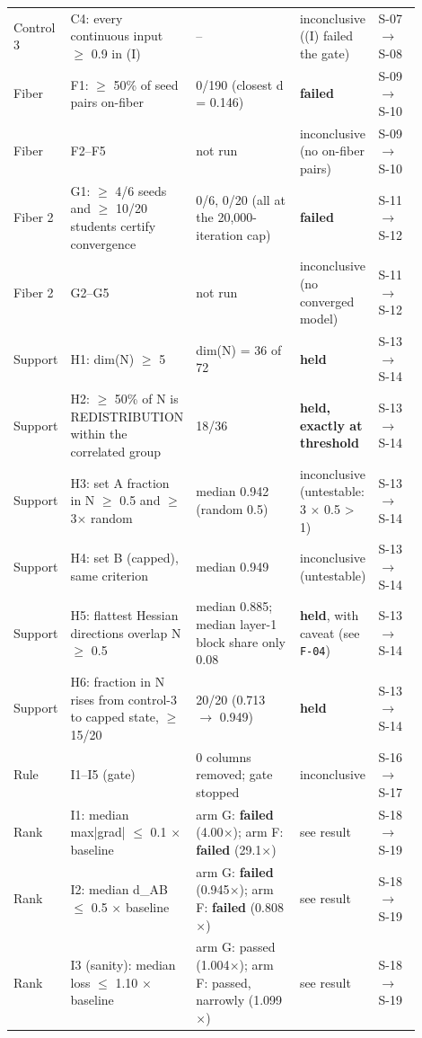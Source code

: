 {\begin{longtable}{R{0.14\linewidth} R{0.26\linewidth} R{0.29\linewidth} R{0.10\linewidth} R{0.11\linewidth}}
Control 3 & C4: every continuous input $\geq$ 0.9 in (I) & -- & inconclusive ((I) failed the gate) & S-07$\to$\allowbreak{}S-08 \\
Fiber & F1: $\geq$ 50\% of seed pairs on-fiber & 0/190 (closest d = 0.146) & \textbf{failed} & S-09$\to$\allowbreak{}S-10 \\
Fiber & F2--F5 & not run & inconclusive (no on-fiber pairs) & S-09$\to$\allowbreak{}S-10 \\
Fiber 2 & G1: $\geq$ 4/6 seeds and $\geq$ 10/20 students certify convergence & 0/6, 0/20 (all at the 20,000-iteration cap) & \textbf{failed} & S-11$\to$\allowbreak{}S-12 \\
Fiber 2 & G2--G5 & not run & inconclusive (no converged model) & S-11$\to$\allowbreak{}S-12 \\
Support & H1: dim(N) $\geq$ 5 & dim(N) = 36 of 72 & \textbf{held} & S-13$\to$\allowbreak{}S-14 \\
Support & H2: $\geq$ 50\% of N is REDISTRIBUTION within the correlated group & 18/36 & \textbf{held, exactly at threshold} & S-13$\to$\allowbreak{}S-14 \\
Support & H3: set A fraction in N $\geq$ 0.5 and $\geq$ 3$\times$ random & median 0.942 (random 0.5) & inconclusive (untestable: 3 $\times$ 0.5 > 1) & S-13$\to$\allowbreak{}S-14 \\
Support & H4: set B (capped), same criterion & median 0.949 & inconclusive (untestable) & S-13$\to$\allowbreak{}S-14 \\
Support & H5: flattest Hessian directions overlap N $\geq$ 0.5 & median 0.885; median layer-1 block share only 0.08 & \textbf{held}, with caveat (see \texttt{F-04}) & S-13$\to$\allowbreak{}S-14 \\
Support & H6: fraction in N rises from control-3 to capped state, $\geq$ 15/20 & 20/20 (0.713 $\to$\allowbreak{} 0.949) & \textbf{held} & S-13$\to$\allowbreak{}S-14 \\
Rule & I1--I5 (gate) & 0 columns removed; gate stopped & inconclusive & S-16$\to$\allowbreak S-17 \\
Rank & I1: median max|grad| $\leq$ 0.1 $\times$ baseline & arm G: \textbf{failed} (4.00$\times$); arm F: \textbf{failed} (29.1$\times$) & see result & S-18$\to$\allowbreak S-19 \\
Rank & I2: median d\_AB $\leq$ 0.5 $\times$ baseline & arm G: \textbf{failed} (0.945$\times$); arm F: \textbf{failed} (0.808$\times$) & see result & S-18$\to$\allowbreak S-19 \\
Rank & I3 (sanity): median loss $\leq$ 1.10 $\times$ baseline & arm G: passed (1.004$\times$); arm F: passed, narrowly (1.099$\times$) & see result & S-18$\to$\allowbreak S-19 \\

\end{longtable}}
